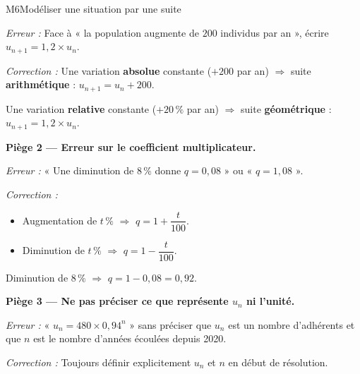 \begin{fichemethode}{M6}{Modéliser une situation par une suite}
{\textit{Erreur :} Face à « la population augmente de $200$ individus par an », écrire $u_{n+1} = 1{,}2 \times u_n$.

\textit{Correction :} Une variation \textbf{absolue} constante ($+200$ par an) $\Rightarrow$ suite \textbf{arithmétique} : $u_{n+1} = u_n + 200$.

Une variation \textbf{relative} constante ($+20\,\%$ par an) $\Rightarrow$ suite \textbf{géométrique} : $u_{n+1} = 1{,}2 \times u_n$.

\medskip
\textbf{Piège 2 — Erreur sur le coefficient multiplicateur.}

\textit{Erreur :} « Une diminution de $8\,\%$ donne $q = 0{,}08$ » ou « $q = 1{,}08$ ».

\textit{Correction :}
\begin{itemize}
  \item Augmentation de $t\,\%$ $\Rightarrow$ $q = 1 + \dfrac{t}{100}$.
  \item Diminution de $t\,\%$ $\Rightarrow$ $q = 1 - \dfrac{t}{100}$.
\end{itemize}
Diminution de $8\,\%$ $\Rightarrow$ $q = 1 - 0{,}08 = 0{,}92$.

\medskip
\textbf{Piège 3 — Ne pas préciser ce que représente $u_n$ ni l'unité.}

\textit{Erreur :} « $u_n = 480 \times 0{,}94^n$ » sans préciser que $u_n$ est un nombre d'adhérents et que $n$ est le nombre d'années écoulées depuis 2020.

\textit{Correction :} Toujours définir explicitement $u_n$ et $n$ en début de résolution.
}



\end{fichemethode}
